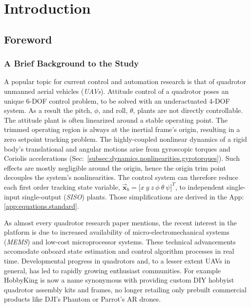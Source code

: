 \chapter{Introduction}
\label{ch:intro}
\section{Foreword}
\label{sec:intro.foreword}
\subsection{A Brief Background to the Study}
\label{subsec:intro.foreword.background}
A popular topic for current control and automation research is that of quadrotor unmanned aerial vehicles (\emph{UAVs}). Attitude control of a quadrotor poses an unique 6-DOF control problem, to be solved with an underactuated 4-DOF system. As a result the pitch, $\phi$, and roll, $\theta$, plants are not directly controllable. The attitude plant is often linearized around a stable operating point. The trimmed operating region is always at the inertial frame's origin, resulting in a zero setpoint tracking problem. The highly-coupled nonlinear dynamics of a rigid body's translational and angular motions arise from gyroscopic torques and Coriolis accelerations (Sec:~\ref{subsec:dynamics.nonlinearities.gyrotorques}). Such effects are mostly negligible around the origin, hence the origin trim point decouples the system's nonlinearities. The control system can therefore reduce each first order tracking state variable, $\vec{\mathbf{x}}_b=\big[x~y~z~\phi~\theta~\psi\big]^T$, to independent single-input single-output (\emph{SISO}) plants. Those simplifications are derived in the App:\ref{app:equations.standard}.
\par
As almost every quadrotor research paper mentions, the recent interest in the platform is due to increased availability of micro-electromechanical systems (\emph{MEMS}) and low-cost microprocessor systems. These technical advancements accomodate onboard state estimation and control algorithm processes in real time. Developmental progress in quadrotors and, to a lesser extent UAVs in general, has led to rapidly growing enthusiast communities. For example HobbyKing\cite{hobbyking} is now a name synonymous with providing custom DIY hobbyist quadrotor assembly kits and frames, no longer retailing only prebuilt commercial products like DJI's Phantom\cite{phantom} or Parrot's AR\cite{parrotar} drones.
